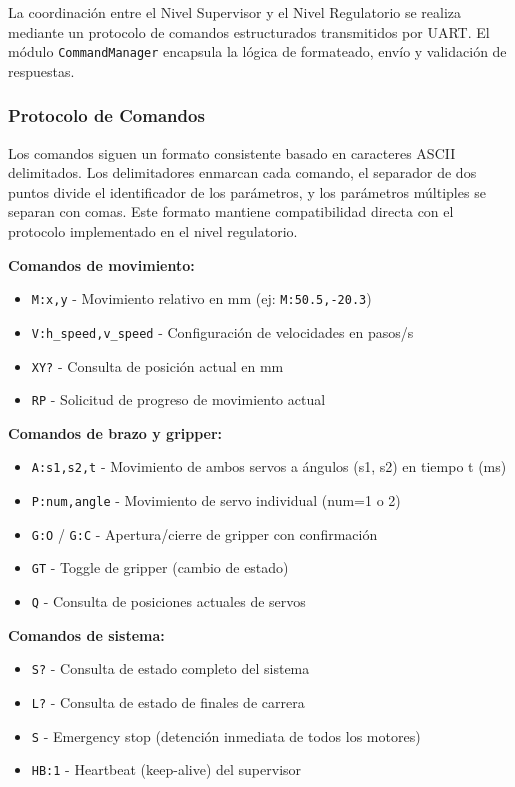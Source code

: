 La coordinación entre el Nivel Supervisor y el Nivel Regulatorio se realiza mediante un protocolo de comandos estructurados transmitidos por UART. El módulo \texttt{CommandManager} encapsula la lógica de formateado, envío y validación de respuestas.

\subsubsection{Protocolo de Comandos}

Los comandos siguen un formato consistente basado en caracteres ASCII delimitados. Los delimitadores enmarcan cada comando, el separador de dos puntos divide el identificador de los parámetros, y los parámetros múltiples se separan con comas. Este formato mantiene compatibilidad directa con el protocolo implementado en el nivel regulatorio.

\textbf{Comandos de movimiento:}
\begin{itemize}
    \item \texttt{M:x,y} - Movimiento relativo en mm (ej: \texttt{M:50.5,-20.3})
    \item \texttt{V:h\_speed,v\_speed} - Configuración de velocidades en pasos/s
    \item \texttt{XY?} - Consulta de posición actual en mm
    \item \texttt{RP} - Solicitud de progreso de movimiento actual
\end{itemize}

\textbf{Comandos de brazo y gripper:}
\begin{itemize}
    \item \texttt{A:s1,s2,t} - Movimiento de ambos servos a ángulos (s1, s2) en tiempo t (ms)
    \item \texttt{P:num,angle} - Movimiento de servo individual (num=1 o 2)
    \item \texttt{G:O} / \texttt{G:C} - Apertura/cierre de gripper con confirmación
    \item \texttt{GT} - Toggle de gripper (cambio de estado)
    \item \texttt{Q} - Consulta de posiciones actuales de servos
\end{itemize}

\textbf{Comandos de sistema:}
\begin{itemize}
    \item \texttt{S?} - Consulta de estado completo del sistema
    \item \texttt{L?} - Consulta de estado de finales de carrera
    \item \texttt{S} - Emergency stop (detención inmediata de todos los motores)
    \item \texttt{HB:1} - Heartbeat (keep-alive) del supervisor
\end{itemize}

